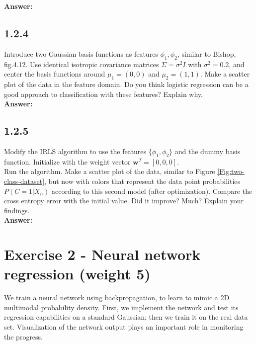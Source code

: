 \documentclass[a4paper]{article}
\begin{document}
\textbf{Answer:}\\







\subsection*{1.2.4}

Introduce two Gaussian basis functions as features $\phi_1, \phi_2$, similar to Bishop, fig.4.12. Use identical isotropic covariance matrices $\Sigma = \sigma^2 I$ with $\sigma^2 = 0.2$, and center the basis functions around $\mu_1 = (0,0)$ and $\mu_2 = (1,1)$. Make a scatter plot of the data in the feature domain. Do you think logistic regression can be a good approach to classification with these features? Explain why.\\

\textbf{Answer:}\\










\subsection*{1.2.5}

Modify the IRLS algorithm to use the features $\{ \phi_1, \phi_2 \}$ and the dummy basis function. Initialize with the weight vector $\textbf{w}^T = [0,0,0]$.\\
Run the algorithm. Make a scatter plot of the data, similar to Figure \ref{Fig:two-class-dataset}, but now with colors that represent the data point probabilities $P(C = 1 | X_n)$ according to this second model (after optimization). Compare the cross entropy error with the initial value. Did it improve? Much? Explain your findings.\\


\textbf{Answer:}\\


\section*{Exercise 2 - Neural network regression (weight 5)}

We train a neural network using backpropagation, to learn to mimic a 2D multimodal probability density. First, we implement the network and test its regression capabilities on a standard Gaussian; then we train it on the real data set. Visualization of the network output plays an important role in monitoring the progress.
\end{document}
